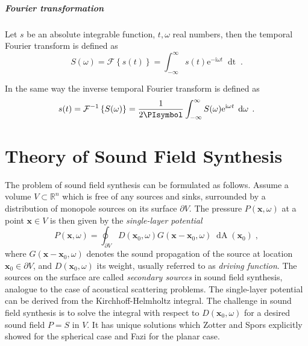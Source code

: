 \documentclass[a4paper]{book}
\newcommand{\reproduce}[1]{%
    \href{#1}{\color{link}\large\Pointinghand}%
}%
\newcommand{\PI}{\PIsymbol}%
\newcommand{\I}{\mathrm{i}}                          %
\newcommand{\E}{\mathrm{e}}                          %
\newcommand{\D}[1]{\mathop{\mathrm{d}{#1}}}          %
\renewcommand{\vec}[1]{\mathbf{#1}}                  %
\newcommand{\x}{\vec{x}}                             %
\newcommand{\R}{\mathbb{R}}                          %
\newcommand{\FT}[1]{\mathcal{F}\left\{#1\right\}}    %
\newcommand{\IFT}[1]{%
    \mathcal{F}^{-1}\left\{#1\right\}}%
\newcommand{\qc}{\;,}                                             %
\newcommand{\qp}{\;.}                                             %
\newcommand\eqlabel[2][]{%
  \label{eq:#2}%
}
\begin{document}
\paragraph{Fourier transformation}
Let $s$ be an absolute integrable function, $t,\omega$ real numbers, then the
temporal Fourier transform is defined as\autocite{Bracewell2000}
%
\begin{equation}
    S(\omega) = \FT{s(t)} = \int^{\infty}_{-\infty} s(t) \E^{-\I\omega t}
    \; \D{t}
    \qp
    \label{eq:ft}
\end{equation}

In the same way the inverse temporal Fourier transform is defined as
%
\begin{equation}
    s(t) = \IFT{S(\omega)} = \frac{1}{2\PI} \int^{\infty}_{-\infty} S(\omega)
    \E^{\I\omega t} \; \D\omega
    \qp
    \label{eq:ift}
\end{equation}


\chapter{Theory of Sound Field Synthesis}
\label{cha:sfs}

%    

The problem of sound field synthesis can be formulated as
follows.\cite[Small parts of this section are published in][]{Wierstorf2013b}
Assume a volume $V \subset \R^n$
which is free of any sources and sinks,
surrounded by a distribution of monopole sources on its
surface $\partial V$. The pressure $P(\x,\omega)$ at a point $\x \in V$ is then
given by the \emph{single-layer potential}
%
\begin{equation}
    P(\x,\omega) = \oint_{\partial V} D(\x_0,\omega) G(\x-\x_0,\omega) \; \D A(\x_0) \qc
    \eqlabel{single:layer}
\end{equation}
%
where $G(\x-\x_0,\omega)$ denotes the sound propagation of the source at
location $\x_0 \in \partial V$, and $D(\x_0,\omega)$ its weight, usually
referred to as \emph{driving function}. The sources on the surface are called
\emph{secondary sources} in sound field synthesis, analogue to the case of acoustical
scattering problems. The single-layer potential can be derived from the
Kirchhoff-Helmholtz integral.\cite{Williams1999}
The challenge in sound field synthesis is to solve the integral
with respect to $D(\x_0,\omega)$ for
a desired sound field $P = S$ in $V$.
It has unique solutions which Zotter and
Spors\cite{Zotter2013} explicitly
showed for the spherical case and Fazi\cite[][Chap.\,4.3]{Fazi2010} for the
planar case.
\end{document}
